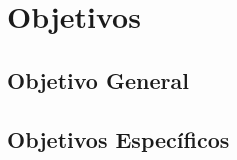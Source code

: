 	\chapter{Objetivos}\label{Cap: Objetivos}
			\section{Objetivo General}\label{Sec: Objetivo General}
				\lipsum[8]
			\section{Objetivos Específicos}\label{Sec: Objetivos Específicos}
				\lipsum[9]
				\lipsum[10]
				\lipsum[11]
				
